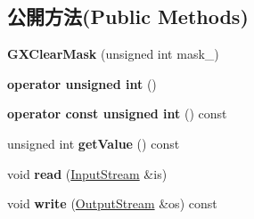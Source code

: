 \subsection*{公開方法(Public Methods)}
\begin{DoxyCompactItemize}
\item 
{\bfseries G\+X\+Clear\+Mask} (unsigned int mask\+\_)\hypertarget{class_magnum_1_1_g_x_clear_mask_a63dedd6cb2cd74f8f4b238147f4e960c}{}\label{class_magnum_1_1_g_x_clear_mask_a63dedd6cb2cd74f8f4b238147f4e960c}

\item 
{\bfseries operator unsigned int} ()\hypertarget{class_magnum_1_1_g_x_clear_mask_adc9505639386d82359b2f80c5b4742d4}{}\label{class_magnum_1_1_g_x_clear_mask_adc9505639386d82359b2f80c5b4742d4}

\item 
{\bfseries operator const unsigned int} () const \hypertarget{class_magnum_1_1_g_x_clear_mask_a5d5747d390a9dd17b467d0c511112c92}{}\label{class_magnum_1_1_g_x_clear_mask_a5d5747d390a9dd17b467d0c511112c92}

\item 
unsigned int {\bfseries get\+Value} () const \hypertarget{class_magnum_1_1_g_x_clear_mask_a352f734082827ed4017a77bec752252d}{}\label{class_magnum_1_1_g_x_clear_mask_a352f734082827ed4017a77bec752252d}

\item 
void {\bfseries read} (\hyperlink{class_magnum_1_1_input_stream}{Input\+Stream} \&is)\hypertarget{class_magnum_1_1_g_x_clear_mask_a3d2473a7c64fe199d75e05bef3704082}{}\label{class_magnum_1_1_g_x_clear_mask_a3d2473a7c64fe199d75e05bef3704082}

\item 
void {\bfseries write} (\hyperlink{class_magnum_1_1_output_stream}{Output\+Stream} \&os) const \hypertarget{class_magnum_1_1_g_x_clear_mask_a684b3d07c6705f364b43f5278080f5e4}{}\label{class_magnum_1_1_g_x_clear_mask_a684b3d07c6705f364b43f5278080f5e4}

\end{DoxyCompactItemize}
